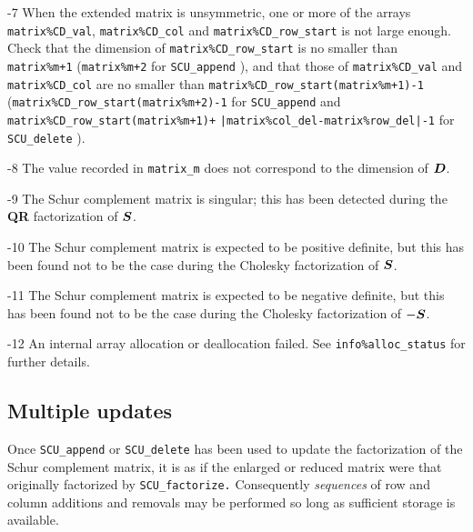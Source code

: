 \documentclass{galahad}
\newcommand{\packagename}{SCU}
\begin{document}
\begin{description}
\item{-7} When the extended matrix is unsymmetric, one or more of the arrays  
{\tt matrix\%CD\_val}, {\tt matrix\%CD\_col} and 
{\tt matrix\%CD\_row\_start} is not large enough. Check that the dimension 
of {\tt matrix\%CD\_row\_start} is no smaller than {\tt matrix\%m+1} 
({\tt matrix\%m+2} for {\tt \packagename\_append} ), and that those of  
{\tt matrix\%CD\_val} and {\tt matrix\%CD\_col} are no smaller than 
{\tt matrix\%CD\_row\_start(matrix\%m+1)-1} 
({\tt matrix\%CD\_row\_start(matrix\%m+2)-1} for {\tt \packagename\_app\-end} 
and {\tt matrix\%CD\_row\_start(matrix\%m+1)+} 
{\tt |matrix\%col\_del-matrix\%row\_del|-1} for {\tt \packagename\_delete} ). 

\item{-8} The value recorded in {\tt matrix\_m} does not correspond to the 
dimension of ${\bm{D}}$.  

\item{-9} The Schur complement matrix is singular; this has been 
detected during the {\bf QR } factorization of ${\bm{S}}$. 

\item{-10} The Schur complement matrix is expected to be positive definite, 
but this has been found not to be the case  
during the Cholesky factorization of ${\bm{S}}$. 

\item{-11} The Schur complement matrix is expected to be negative definite, 
but this has been found not to be the case  
during the Cholesky factorization of $-  {\bm{S}}$. 

\item{-12} An internal array allocation or deallocation failed.  
See {\tt info\%alloc\_status} for further details. 
 
\end{description}


\subsection{Multiple updates}
Once {\tt \packagename\_append} or {\tt \packagename\_delete} 
has been used to update the factorization of 
the Schur complement matrix, it is as if the enlarged or 
reduced matrix were 
that originally factorized by {\tt \packagename\_factorize.} 
Consequently {\em sequences} of row and column additions and removals 
may be performed so long as sufficient storage is 
available. 
\end{document}
